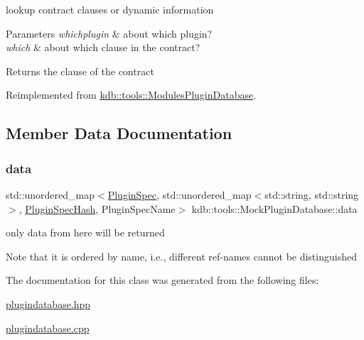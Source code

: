 lookup contract clauses or dynamic information 


\begin{DoxyParams}{Parameters}
{\em whichplugin} & about which plugin? \\
\hline
{\em which} & about which clause in the contract?\\
\hline
\end{DoxyParams}
\begin{DoxyReturn}{Returns}
the clause of the contract 
\end{DoxyReturn}


Reimplemented from \hyperlink{classkdb_1_1tools_1_1ModulesPluginDatabase_a3f51beee8aecb4371e7d12e98958f875}{kdb\+::tools\+::\+Modules\+Plugin\+Database}.



\subsection{Member Data Documentation}
\mbox{\label{classkdb_1_1tools_1_1MockPluginDatabase_a5de7756d9e7fb78d53903c92208d7fbe}} 
\subsubsection{\texorpdfstring{data}{data}}
{\footnotesize\ttfamily std\+::unordered\+\_\+map$<$\hyperlink{classkdb_1_1tools_1_1PluginSpec}{Plugin\+Spec}, std\+::unordered\+\_\+map$<$std\+::string, std\+::string$>$, \hyperlink{structkdb_1_1tools_1_1PluginSpecHash}{Plugin\+Spec\+Hash}, Plugin\+Spec\+Name$>$ kdb\+::tools\+::\+Mock\+Plugin\+Database\+::data\hspace{0.3cm}{\ttfamily [mutable]}}



only data from here will be returned 

\begin{DoxyNote}{Note}
that it is ordered by name, i.\+e., different ref-\/names cannot be distinguished 
\end{DoxyNote}


The documentation for this class was generated from the following files\+:\begin{DoxyCompactItemize}
\item 
\hyperlink{plugindatabase_8hpp}{plugindatabase.\+hpp}\item 
\hyperlink{plugindatabase_8cpp}{plugindatabase.\+cpp}\end{DoxyCompactItemize}
